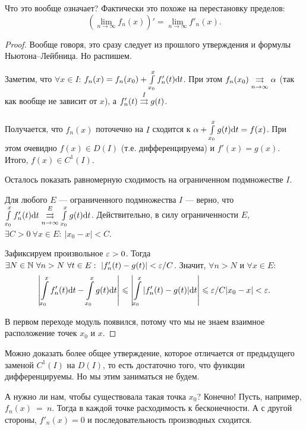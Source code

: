 \documentclass[a4paper, 12pt]{article}
\begin{document}
Что это вообще означает? Фактически это похоже на перестановку пределов:
$$
(\lim\limits_{n \to \infty} f_n(x))' = \lim\limits_{n \to \infty} f'_n(x). 
$$

\begin{proof}
Вообще говоря, это сразу следует из прошлого утверждения и формулы Ньютона--Лейбница. Но распишем.

Заметим, что $\forall x \in I$: $f_n(x) = f_n(x_0) + \int\limits_{x_0}^x f'_n(t) \mathrm{d} t$. При этом $f_n(x_0) \overset{}{\underset{n \to \infty}{\rightrightarrows}} \alpha$ (так как вообще не зависит от $x$), а $f'_n(t) \overset{I}{\underset{}{\rightrightarrows}} g(t)$.

Получается, что $f_n(x)$ поточечно на $I$ сходится к $\alpha + \int\limits_{x_0}^x g(t)\mathrm{d} t = f(x)$. При этом очевидно $f(x) \in D(I)$ (т.е. дифференцируема) и $f'(x) = g(x)$. Итого, $f(x) \in C^1(I)$.

Осталось показать равномерную сходимость на ограниченном подмножестве $I$.

Для любого $E$ --- ограниченного подмножества $I$ --- верно, что $\int\limits_{x_0}^xf'_n(t) \mathrm{d} t \overset{E}{\underset{n \to \infty}{\rightrightarrows}} \int\limits_{x_0}^x g(t) \mathrm{d} t$. Действительно, в силу ограниченности $E$, $\exists C > 0\ \forall x \in E: \ |x_0 - x| < C$.

Зафиксируем произвольное $\varepsilon > 0$. Тогда $\exists N \in \mathbb{N}\ \forall n > N\ \forall t \in E:\ |f'_n(t) - g(t)| < \varepsilon/C$. Значит, $\forall n > N$ и $\forall x \in E$:
\begin{gather}
\left| \int\limits_{x_0}^x f'_n(t) \mathrm{d} t - \int\limits_{x_0}^x g(t) \mathrm{d} t \right| \leqslant \left| \int\limits_{x_0}^x |f'_n(t) - g(t)| \mathrm{d} t \right| \leqslant \varepsilon/C |x_0 - x| < \varepsilon.
\end{gather}

В первом переходе модуль появился, потому что мы не знаем взаимное расположение точек $x_0$ и $x$.
\end{proof}

Можно доказать более общее утверждение, которое отличается от предыдущего заменой $C^1(I)$ на $D(I)$, то есть достаточно того, что функции дифференцируемы. Но мы этим заниматься не будем.

А нужно ли нам, чтобы существовала такая точка $x_0$? Конечно! Пусть, например, $f_n(x)~=~n$. Тогда в каждой точке расходимость к бесконечности. А с другой стороны, $f'_n(x) = 0$ и последовательность производных сходится.
\end{document}
